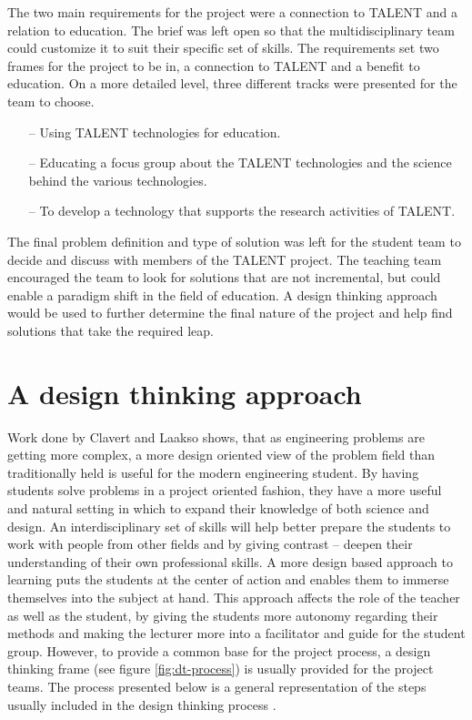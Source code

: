 \documentclass[english,12pt,a4paper,pdftex]{article}
\begin{document}
The two main requirements for the project were a connection to TALENT and a relation to education. The brief was left  open so that the multidisciplinary team could customize it to suit their specific set of skills. The requirements set  two frames for the project to be in, a connection to TALENT and a benefit to education. On a more detailed level, three different tracks were presented for the team to choose.

\begin{itemize}
\item[--]Using TALENT technologies for education.
\item[--]Educating a focus group about the TALENT technologies and the science behind the various technologies.
\item[--]To develop a technology that supports the research activities of TALENT.
\end{itemize}

The final problem definition and type of solution was left for the student team to decide and discuss with members of the TALENT project. The teaching team encouraged the team to look for solutions that are not incremental, but could enable a paradigm shift in the field of education. A design thinking approach would be used to further determine the final nature of the project and help find solutions that take the required leap.


\clearpage

\section{A design thinking approach}

Work done by Clavert and Laakso \cite{Clavert} shows, that as engineering problems are getting more complex, a more design oriented view of the problem field than traditionally held is useful for the modern engineering student. By having students solve problems in a project oriented fashion, they have a more useful and natural setting in which to expand their knowledge of both science and design. An interdisciplinary set of skills will help better prepare the students to work with people from other fields and by giving contrast -- deepen their understanding of their own professional skills. A more design based approach to learning puts the students at the center of action and enables them to immerse themselves into the subject at hand. This approach affects the role of the teacher as well as the student, by giving the students more autonomy regarding their methods and making the lecturer more into a facilitator and guide for the student group. However, to provide a common base for the project process, a design thinking frame (see figure \ref{fig:dt-process}) is usually provided for the project teams. The process presented below is a general representation of the steps usually included in the design thinking process \cite{Brown}. 
\end{document}
